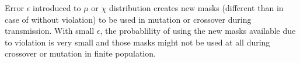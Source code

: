 Error $\epsilon$ introduced to $\mu$ or $\chi$ distribution creates new masks (different than in case of without violation) 
to be used in mutation or crossover during transmission.
With small $\epsilon$, the probablility of using the new masks available due to violation is very small and 
those masks might not be used at all during crossover or mutation in finite population.









 
